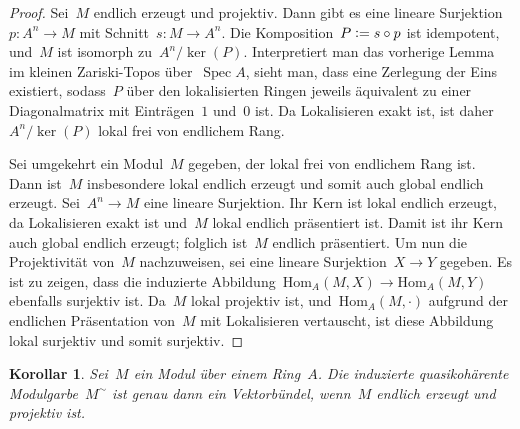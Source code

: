 \documentclass[12pt]{scrartcl}
\theoremstyle{definition}
\theoremstyle{plain}
\newtheorem*{cor}{Korollar}
\theoremstyle{remark}
\newcommand{\defeq}{\vcentcolon=}
\newcommand{\Hom}{\mathrm{Hom}}
\begin{document}
\begin{proof}Sei~$M$ endlich erzeugt und projektiv. Dann gibt es eine lineare
Surjektion~$p : A^n \to M$ mit Schnitt~$s : M \to A^n$. Die Komposition~$P
\defeq s \circ p$ ist idempotent, und~$M$ ist isomorph zu~$A^n/\operatorname{ker}(P)$.
Interpretiert man das vorherige Lemma im kleinen Zariski-Topos
über~$\operatorname{Spec} A$, sieht man, dass eine Zerlegung der Eins
existiert, sodass~$P$ über den lokalisierten Ringen jeweils äquivalent zu einer
Diagonalmatrix mit Einträgen~$1$ und~$0$ ist. Da Lokalisieren exakt ist, ist
daher~$A^n/\operatorname{ker}(P)$ lokal frei von endlichem Rang.

Sei umgekehrt ein Modul~$M$ gegeben, der lokal frei von endlichem Rang ist.
Dann ist~$M$ insbesondere lokal endlich erzeugt und somit auch global endlich erzeugt. Sei~$A^n \to M$ eine lineare
Surjektion. Ihr Kern ist lokal endlich erzeugt, da Lokalisieren exakt ist
und~$M$ lokal endlich präsentiert ist. Damit ist ihr Kern auch global endlich
erzeugt; folglich ist~$M$ endlich präsentiert. Um nun die Projektivität
von~$M$ nachzuweisen, sei eine lineare Surjektion~$X \to Y$ gegeben. Es ist zu
zeigen, dass die induzierte Abbildung~$\Hom_A(M,X) \to \Hom_A(M,Y)$ ebenfalls
surjektiv ist. Da~$M$ lokal projektiv ist, und~$\Hom_A(M,\cdot)$ aufgrund der
endlichen Präsentation von~$M$ mit Lokalisieren vertauscht, ist diese Abbildung
lokal surjektiv und somit surjektiv.
\end{proof}

\begin{cor}Sei~$M$ ein Modul über einem Ring~$A$. Die induzierte
quasikohärente Modulgarbe~$M^\sim$ ist genau dann ein Vektorbündel, wenn~$M$
endlich erzeugt und projektiv ist.\end{cor}

\end{document}
